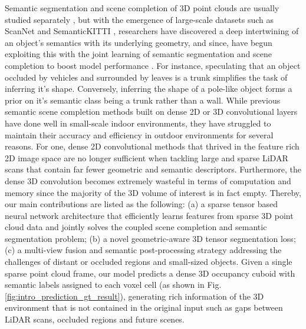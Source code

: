 \documentclass{article}
\begin{document}
Semantic segmentation and scene completion of 3D point clouds are usually studied separately \cite{gupta2013perceptual, firman2016structured}, but with the emergence of large-scale datasets such as ScanNet \cite{dai2017scannet} and SemanticKITTI \cite{behley2019semantickitti}, researchers have discovered a deep intertwining of an object's semantics with its underlying geometry, and since, have begun exploiting this with the joint learning of semantic segmentation and scene completion to boost model performance \cite{song2017semantic}. For instance, speculating that an object occluded by vehicles and surrounded by leaves is a trunk simplifies the task of inferring it's shape. Conversely, inferring the shape of a pole-like object forms a prior on it's semantic class being a trunk rather than a wall. While previous semantic scene completion methods built on dense 2D or 3D convolutional layers have done well in small-scale indoor environments, they have struggled to maintain their accuracy and efficiency in outdoor environments for several reasons. For one, dense 2D convolutional methods that thrived in the feature rich 2D image space are no longer sufficient when tackling large and sparse LiDAR scans that contain far fewer geometric and semantic descriptors. Furthermore, the dense 3D convolution becomes extremely wasteful in terms of computation and memory since the majority of the 3D volume of interest is in fact empty. Thereby, our main contributions are listed as the following: (a) a sparse tensor based neural network architecture that efficiently learns features from sparse 3D point cloud data and jointly solves the coupled scene completion and semantic segmentation problem; (b) a novel geometric-aware 3D tensor segmentation loss; (c) a multi-view fusion and semantic post-processing strategy addressing the challenges of distant or occluded regions and small-sized objects. Given a single sparse point cloud frame, our model predicts a dense 3D occupancy cuboid with semantic labels assigned to each voxel cell (as shown in Fig. \ref{fig:intro_prediction_gt_result}), generating rich information of the 3D environment that is not contained in the original input such as gaps between LiDAR scans, occluded regions and future scenes.
\end{document}
